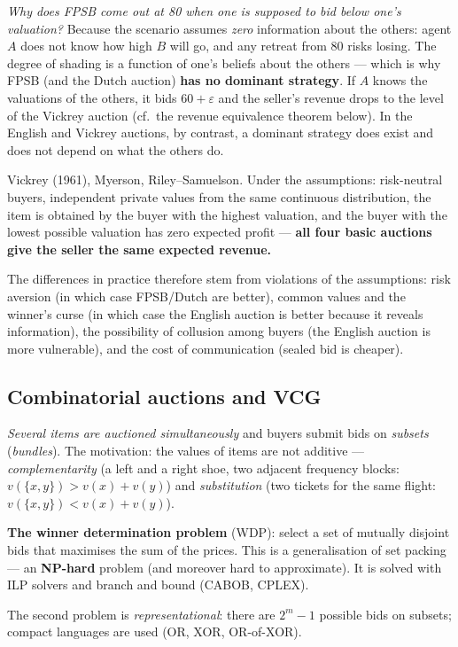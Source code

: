 \documentclass[11pt,a4paper]{article}
\theoremstyle{definition}
\begin{document}
\emph{Why does FPSB come out at 80 when one is supposed to bid below one's valuation?} Because the
scenario assumes \emph{zero} information about the others: agent $A$ does not know how high $B$ will
go, and any retreat from 80 risks losing. The degree of shading is a function of one's beliefs about
the others --- which is why FPSB (and the Dutch auction) \textbf{has no dominant strategy}. If $A$
knows the valuations of the others, it bids $60+\varepsilon$ and the seller's revenue drops to the
level of the Vickrey auction (cf.\ the revenue equivalence theorem below). In the English and Vickrey
auctions, by contrast, a dominant strategy does exist and does not depend on what the others do.

\begin{defbox}
Vickrey (1961), Myerson, Riley--Samuelson. Under the assumptions: risk-neutral buyers,
independent private values from the same continuous distribution, the item is obtained by the buyer
with the highest valuation, and the buyer with the lowest possible valuation has zero expected
profit --- \textbf{all four basic auctions give the seller the same expected revenue.}

The differences in practice therefore stem from violations of the assumptions: risk aversion (in which
case FPSB/Dutch are better), common values and the winner's curse (in which case the English auction is
better because it reveals information), the possibility of collusion among buyers (the English auction
is more vulnerable), and the cost of communication (sealed bid is cheaper).
\end{defbox}
\subsection{Combinatorial auctions and VCG}

\begin{defbox}
\emph{Several items are auctioned simultaneously} and buyers submit bids on \emph{subsets}
(\emph{bundles}). The motivation: the values of items are not additive ---
\emph{complementarity} (a left and a right shoe, two adjacent frequency blocks:
$v(\{x,y\}) > v(x)+v(y)$) and \emph{substitution} (two tickets for the same flight:
$v(\{x,y\}) < v(x)+v(y)$).

\textbf{The winner determination problem} (WDP): select a set of mutually disjoint bids that maximises
the sum of the prices. This is a generalisation of set packing --- an \textbf{NP-hard}
problem (and moreover hard to approximate). It is solved with ILP solvers and branch and bound
(CABOB, CPLEX).

The second problem is \emph{representational}: there are $2^m - 1$ possible bids on subsets;
compact languages are used (OR, XOR, OR-of-XOR).
\end{defbox}
\end{document}
